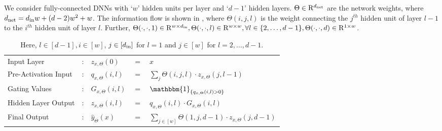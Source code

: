 We consider fully-connected DNNs with `$w$' hidden units per layer and `$d-1$' hidden layers. $\Theta\in\mathrm{R}^{d_{\text{net}}}$ are the network weights, where $d_{\text{net}}=d_{\text{in}} w+(d-2)w^2+w$. The information flow is shown in , where
$\Theta(i,j,l)$ is the weight connecting the $j^{th}$ hidden unit of layer $l-1$ to the $i^{th}$ hidden unit of layer $l$. Further, $\Theta(\cdot,\cdot,1)\in\mathrm{R}^{w\times d_{\text{in}}}, \Theta(\cdot,\cdot,l)\in\mathrm{R}^{w\times w},\forall l\in\{2,\ldots,d-1\}, \Theta(\cdot,\cdot,d)\in\mathrm{R}^{1\times w}$.
\begin{table}[h]
\centering
\begin{tabular}{|l l lll|}\hline
Input Layer&: &$z_{x,\Theta}(0)$ &$=$ &$x$ \\
Pre-Activation Input&: & $q_{x,\Theta}(i,l)$& $=$ & $\sum_{j} \Theta(i,j,l)\cdot z_{x,\Theta}(j,l-1)$\\
Gating Values&: &$G_{x,\Theta}(i,l)$& $=$ & $\mathbbm{1}_{\{q_{x,\Theta}(i,l)>0\}}$\\
Hidden Layer Output&: &$z_{x,\Theta}(i,l)$ & $=$ & $q_{x,\Theta}(i,l)\cdot G_{x,\Theta}(i,l)$ \\
Final Output&: & $\hat{y}_{\Theta}(x)$ & $=$ & $\sum_{j\in[w]} \Theta(1,j,d-1)\cdot z_{x,\Theta}(j,d-1)$\\\hline
\end{tabular}
\caption{Here, $l\in[d-1],i\in[w]$, $j\in[d_{\text{in}}]$ for $l=1$ and $j\in[w]$ for $l=2,\ldots,d-1$.} 
\label{tb:basic}
\end{table}

\begin{comment}

CNN, Resnet to say that the framework can be extended successfully.

Perhaps the second important and powerful insights lie in the experimental implication contribution

why do we even care for a specific theory?

All through we differentiate from \cite{npk}
\end{comment}